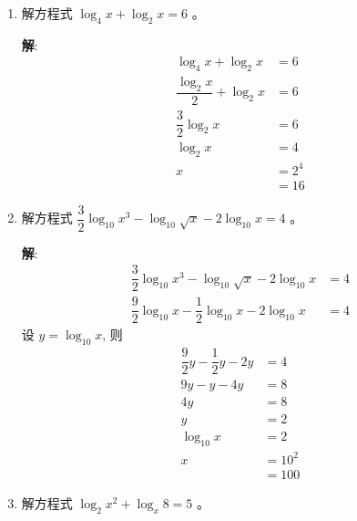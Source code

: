 \documentclass{report}
\newcommand{\sol}{\vspace{0.2cm}\textbf{解}:}
\begin{document}
\begin{multicols*}{2}
\begin{enumerate}[leftmargin=*]
        \item 解方程式 $\log _4 x+\log _2 x=6$ 。

              \sol{}
              \begin{align*}
                  \log_4 x + \log_2 x            & = 6   \\
                  \dfrac{\log_2 x}{2} + \log_2 x & = 6   \\
                  \dfrac{3}{2} \log_2 x          & = 6   \\
                  \log_2 x                       & = 4   \\
                  x                              & = 2^4 \\
                                                 & = 16
              \end{align*}

        \item 解方程式 $\dfrac{3}{2} \log _{10} x^3-\log _{10} \sqrt{x}-2 \log _{10} x=4$ 。

              \sol{}
              \begin{align*}
                  \dfrac{3}{2} \log_{10} x^3 - \log_{10} \sqrt{x} - 2 \log_{10} x     & = 4 \\
                  \dfrac{9}{2} \log_{10} x - \dfrac{1}{2} \log_{10} x - 2 \log_{10} x & = 4
              \end{align*}
              设 $y = \log_{10} x$, 则
              \begin{align*}
                  \dfrac{9}{2} y - \dfrac{1}{2} y - 2y & = 4    \\
                  9y - y - 4y                          & = 8    \\
                  4y                                   & = 8    \\
                  y                                    & = 2    \\
                  \log_{10} x                          & = 2    \\
                  x                                    & = 10^2 \\
                                                       & = 100
              \end{align*}

        \item 解方程式 $\log _2 x^2+\log _x 8=5$ 。


\end{enumerate}
\end{multicols*}
\end{document}
